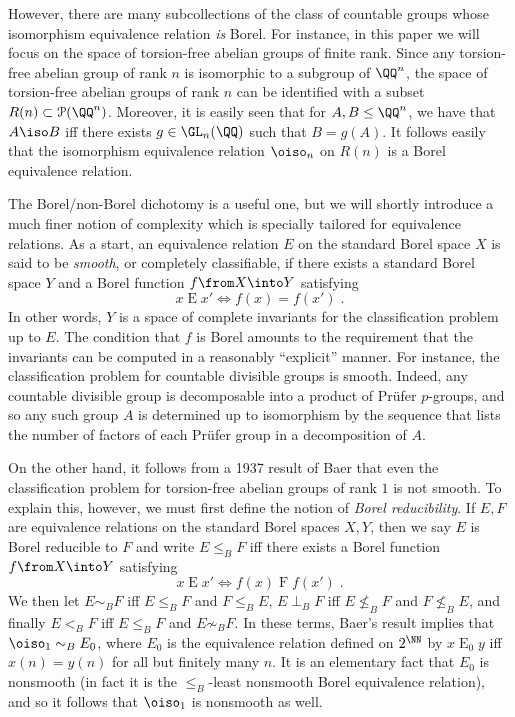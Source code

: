 \documentclass[oneside,leqno,11pt]{amsart}
\begin{document}
However, there are many subcollections of the class of countable
groups whose isomorphism equivalence relation \emph{is} Borel.  For
instance, in this paper we will focus on the space of torsion-free
abelian groups of finite rank.  Since any torsion-free abelian group
of rank $n$ is isomorphic to a subgroup of $\QQ^n$, the space of
torsion-free abelian groups of rank $n$ can be identified with a
subset $R(n)\subset\mathcal P(\QQ^n)$.  Moreover, it is easily seen
that for $A,B\leq\QQ^n$, we have that $A\iso B$ iff there exists
$g\in\GL_n(\QQ)$ such that $B=g(A)$.  It follows easily that the
isomorphism equivalence relation $\oiso_n$ on $R(n)$ is a Borel
equivalence relation.

The Borel/non-Borel dichotomy is a useful one, but we will shortly
introduce a much finer notion of complexity which is specially
tailored for equivalence relations.  As a start, an equivalence
relation $E$ on the standard Borel space $X$ is said to be
\emph{smooth}, or completely classifiable, if there exists a standard
Borel space $Y$ and a Borel function $f\from X\into Y$ satisfying
\[x\mathrel{E}x'\iff f(x)=f(x')\;.
\]
In other words, $Y$ is a space of complete invariants for the
classification problem up to $E$.  The condition that $f$ is Borel
amounts to the requirement that the invariants can be computed in a
reasonably ``explicit'' manner.  For instance, the classification
problem for countable divisible groups is smooth.  Indeed, any
countable divisible group is decomposable into a product of Pr\"ufer
$p$-groups, and so any such group $A$ is determined up to isomorphism
by the sequence that lists the number of factors of each Pr\"ufer
group in a decomposition of $A$.

On the other hand, it follows from a 1937 result of Baer that even the
classification problem for torsion-free abelian groups of rank $1$ is
not smooth.  To explain this, however, we must first define the notion
of \emph{Borel reducibility}.  If $E,F$ are equivalence relations on
the standard Borel spaces $X,Y$, then we say $E$ is Borel reducible to
$F$ and write $E\leq_BF$ iff there exists a Borel function
$f\from X\into Y$ satisfying
\[x\mathrel{E}x'\iff f(x)\mathrel{F}f(x')\;.
\]
We then let $E\sim_BF$ iff $E\leq_BF$ and $F\leq_BE$, $E\perp_BF$ iff
$E\not\leq_BF$ and $F\not\leq_BE$, and finally $E<_BF$ iff $E\leq_BF$
and $E\not\sim_BF$.  In these terms, Baer's result implies that
$\oiso_1\sim_BE_0$, where $E_0$ is the equivalence relation defined on
$2^\NN$ by $x\mathrel{E}_0y$ iff $x(n)=y(n)$ for all but finitely many
$n$.  It is an elementary fact that $E_0$ is nonsmooth (in fact it is
the $\leq_B$-least nonsmooth Borel equivalence relation), and so it
follows that $\oiso_1$ is nonsmooth as well.
\end{document}
